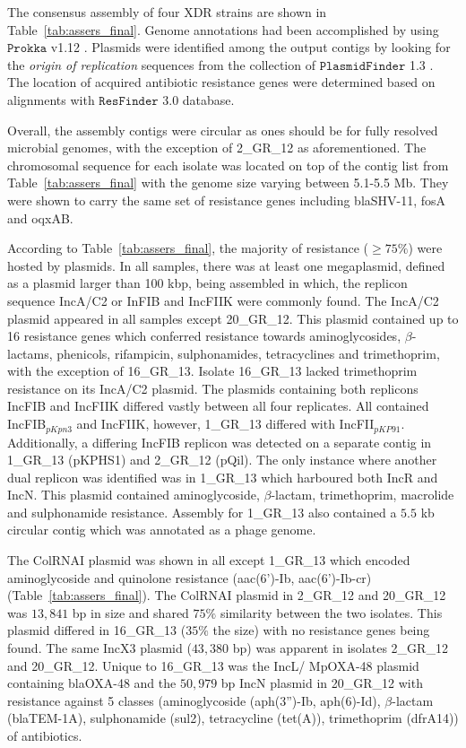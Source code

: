 The consensus assembly of four XDR \kp{} strains are shown in Table~\ref{tab:assers_final}. 
Genome annotations had been accomplished by using $\mathtt{Prokka}$ v1.12 \cite{Seemann2014}. 
Plasmids were identified among the output contigs by looking for the \emph{origin of replication} sequences from the collection of $\mathtt{PlasmidFinder}$ 1.3 \cite{Carattoli2014}.
The location of acquired antibiotic resistance genes were determined based on alignments with $\mathtt{ResFinder}$ 3.0 \cite{ZankariHC2012} database. 

Overall, the assembly contigs were circular as ones should be for fully resolved microbial genomes, with the exception of 2\_GR\_12 as aforementioned. 
The chromosomal sequence for each isolate was located on top of the contig list from Table~\ref{tab:assers_final} with the genome size varying between 5.1-5.5 Mb. They were shown to carry the same set of resistance genes including blaSHV-11, fosA and oqxAB. 


According to Table~\ref{tab:assers_final}, the majority of resistance ($\geq 75\%$) were hosted by plasmids.
In all samples, there was at least one megaplasmid, defined as a plasmid larger than 100 kbp, being assembled in which, the replicon sequence IncA/C2 or InFIB and IncFIIK were commonly found.
The IncA/C2 plasmid appeared in all samples except 20\_GR\_12. 
This plasmid contained up to 16 resistance genes which conferred resistance towards aminoglycosides, $\beta$-lactams, phenicols, rifampicin, sulphonamides, tetracyclines and trimethoprim, with the exception of 16\_GR\_13. Isolate 16\_GR\_13 lacked trimethoprim resistance on its IncA/C2 plasmid. 
The plasmids containing both replicons IncFIB and IncFIIK differed vastly between all four replicates. 
All contained IncFIB$_{pKpn3}$ and IncFIIK, however, 1\_GR\_13 differed with IncFII$_{pKP91}$. Additionally, a differing IncFIB replicon was detected on a separate contig in 1\_GR\_13 (pKPHS1) and 2\_GR\_12 (pQil). 
The only instance where another dual replicon was identified was in 1\_GR\_13 which harboured both IncR and IncN. 
This plasmid contained aminoglycoside, $\beta$-lactam, trimethoprim, macrolide and sulphonamide resistance. 
Assembly for 1\_GR\_13 also contained a $5.5$ kb circular contig which was annotated as a phage genome.

The ColRNAI plasmid was shown in all except 1\_GR\_13 which encoded aminoglycoside and quinolone resistance (aac(6')-Ib, aac(6')-Ib-cr) (Table~\ref{tab:assers_final}).
The ColRNAI plasmid in 2\_GR\_12 and 20\_GR\_12 was $13,841$ bp in size and shared $75\%$ similarity between the two isolates. This plasmid differed in 16\_GR\_13 ($35\%$ the size) with no resistance genes being found. 
The same IncX3 plasmid ($43,380$ bp) was apparent in isolates 2\_GR\_12 and 20\_GR\_12.
Unique to 16\_GR\_13 was the IncL/ MpOXA-48 plasmid containing blaOXA-48 and the $50,979$ bp IncN plasmid in 20\_GR\_12 with resistance against 5 classes (aminoglycoside (aph(3'')-Ib, aph(6)-Id), $\beta$-lactam (blaTEM-1A), sulphonamide (sul2), tetracycline (tet(A)), trimethoprim (dfrA14)) of antibiotics.

